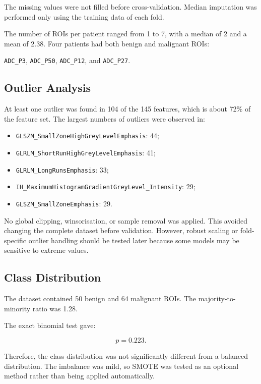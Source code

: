 \documentclass[10pt,a4paper]{article}
\begin{document}
The missing values were not filled before cross-validation. Median imputation was performed only using the training data of each fold.

The number of ROIs per patient ranged from 1 to 7, with a median of 2 and a mean of 2.38. Four patients had both benign and malignant ROIs:

\begin{center}
\texttt{ADC\_P3}, \texttt{ADC\_P50}, \texttt{ADC\_P12}, and \texttt{ADC\_P27}.
\end{center}


\subsection{Outlier Analysis}

At least one outlier was found in 104 of the 145 features, which is about 72\% of the feature set. The largest numbers of outliers were observed in:

\begin{itemize}[leftmargin=1.5em]
    \item \texttt{GLSZM\_SmallZoneHighGreyLevelEmphasis}: 44;
    \item \texttt{GLRLM\_ShortRunHighGreyLevelEmphasis}: 41;
    \item \texttt{GLRLM\_LongRunsEmphasis}: 33;
    \item \texttt{IH\_MaximumHistogramGradientGreyLevel\_Intensity}: 29;
    \item \texttt{GLSZM\_SmallZoneEmphasis}: 29.
\end{itemize}

No global clipping, winsorisation, or sample removal was applied. This avoided changing the complete dataset before validation. However, robust scaling or fold-specific outlier handling should be tested later because some models may be sensitive to extreme values.

\subsection{Class Distribution}

The dataset contained 50 benign and 64 malignant ROIs. The majority-to-minority ratio was 1.28.

The exact binomial test gave:

\[
p = 0.223.
\]

Therefore, the class distribution was not significantly different from a balanced distribution. The imbalance was mild, so SMOTE was tested as an optional method rather than being applied automatically.
\end{document}
